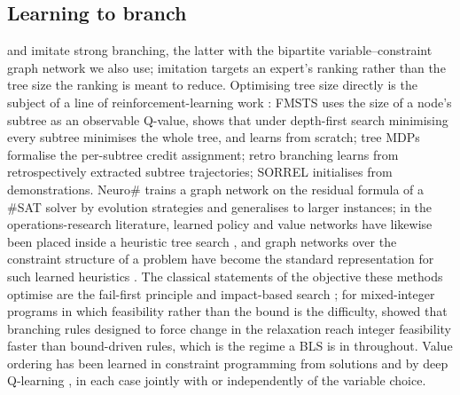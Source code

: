 \documentclass[final,5p,times,twocolumn,authoryear]{elsarticle}
\begin{document}
\subsection{Learning to branch}
\citet{khalil2016learning} and \citet{gasse2019exact} imitate strong branching, the latter with the bipartite variable--constraint graph network we also use; imitation targets an expert's ranking rather than the tree size the ranking is meant to reduce. Optimising tree size directly is the subject of a line of reinforcement-learning work \citep[surveyed, with the wider use of reinforcement learning inside exact solvers, by][]{mazyavkina2021reinforcement}: FMSTS \citep{etheve2020reinforcement} uses the size of a node's subtree as an observable Q-value, shows that under depth-first search minimising every subtree minimises the whole tree, and learns from scratch; tree MDPs \citep{scavuzzo2022learning} formalise the per-subtree credit assignment; retro branching \citep{parsonson2023reinforcement} learns from retrospectively extracted subtree trajectories; SORREL \citep{sorrel2025} initialises from demonstrations. Neuro\# \citep{vaezipoor2021learning} trains a graph network on the residual formula of a \#SAT solver by evolution strategies and generalises to larger instances; in the operations-research literature, learned policy and value networks have likewise been placed inside a heuristic tree search \citep{hottung2020deep}, and graph networks over the constraint structure of a problem have become the standard representation for such learned heuristics \citep{smit2025graph}. The classical statements of the objective these methods optimise are the fail-first principle \citep{haralick1980increasing} and impact-based search \citep{refalo2004impact}; for mixed-integer programs in which feasibility rather than the bound is the difficulty, \citet{pryor2011faster} showed that branching rules designed to force change in the relaxation reach integer feasibility faster than bound-driven rules, which is the regime a BLS is in throughout. Value ordering has been learned in constraint programming from solutions \citep{chu2015learning} and by deep Q-learning \citep{cappart2021combining}, in each case jointly with or independently of the variable choice.
\end{document}
